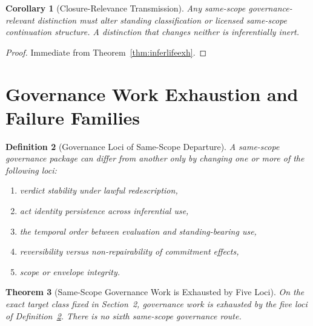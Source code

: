 \documentclass[11pt]{article}
\newtheorem{theorem}{Theorem}[section]
\newtheorem{definition}[theorem]{Definition}
\newtheorem{corollary}[theorem]{Corollary}
\begin{document}
\begin{corollary}[Closure-Relevance Transmission]
\label{cor:closuretrans}
Any same-scope governance-relevant distinction must alter standing classification or licensed same-scope continuation structure. A distinction that changes neither is inferentially inert.
\end{corollary}

\begin{proof}
Immediate from Theorem~\ref{thm:inferlifeexh}.
\end{proof}

\section{Governance Work Exhaustion and Failure Families}

\begin{definition}[Governance Loci of Same-Scope Departure]
\label{def:loci}
A same-scope governance package can differ from another only by changing one or more of the following loci:
\begin{enumerate}
\item[(L1)] verdict stability under lawful redescription,
\item[(L2)] act identity persistence across inferential use,
\item[(L3)] the temporal order between evaluation and standing-bearing use,
\item[(L4)] reversibility versus non-repairability of commitment effects,
\item[(L5)] scope or envelope integrity.
\end{enumerate}
\end{definition}

\begin{theorem}[Same-Scope Governance Work is Exhausted by Five Loci]
\label{thm:fivework}
On the exact target class fixed in Section~2, governance work is exhausted by the five loci of Definition~\ref{def:loci}. There is no sixth same-scope governance route.
\end{theorem}
\end{document}
